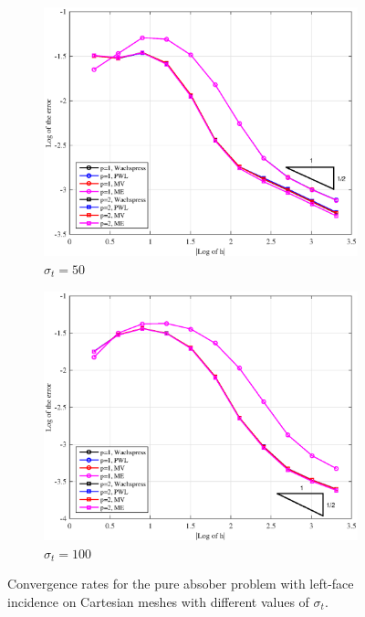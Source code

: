 \begin{figure}
{}
\vspace{1cm}
{
	\begin{subfigure}[b]{0.485\textwidth}
		\centering
		\label{subfig::PA_Left_Cart_sig50}
		\includegraphics[width=\textwidth]{figures/sec_BF/PAErr_Left_Cart_sig50.eps}
	\caption{$\sigma_t = 50$}
	\end{subfigure}
	\hfill
	\begin{subfigure}[b]{0.485\textwidth}
		\centering
		\label{subfig::PA_Left_Cart_sig100}
		\includegraphics[width=\textwidth]{figures/sec_BF/PAErr_Left_Cart_sig100.eps}
	\caption{$\sigma_t = 100$}
	\end{subfigure}
}
\caption{Convergence rates for the pure absober problem with left-face incidence on Cartesian meshes with different values of $\sigma_t$.}
\label{fig::BF_Results_PA_Left_Cart}
\end{figure}

